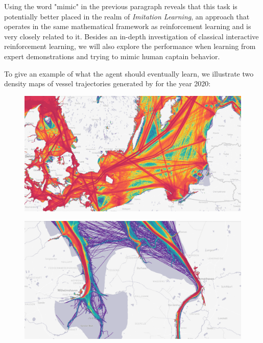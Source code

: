 \par
Using the word "mimic" in the previous paragraph reveals that this task is potentially better placed in the realm of \textit{Imitation Learning}, an approach that operates in the same mathematical framework as reinforcement learning and is very closely related to it. Besides an in-depth investigation of classical interactive reinforcement learning, we will also explore the performance when learning from expert demonstrations and trying to mimic human captain behavior.
\par
To give an example of what the agent should eventually learn, we illustrate two density maps of vessel trajectories generated by \cite{martinetraffic} for the year 2020:
\begin{figure}[H]
    \centering
    \begin{minipage}{.47\textwidth}
      \centering
      \includegraphics[width=\textwidth]{images/balticsea_density_routes.PNG}
      \label{fig:baltic}
    \end{minipage}
    \hspace{.05\textwidth}%
    \begin{minipage}{.47\textwidth}
        \centering
        \includegraphics[width=\textwidth]{images/bhv_jadebusen_density_routes.PNG}
        \label{fig:jadebusen}
      \end{minipage}
\end{figure}
